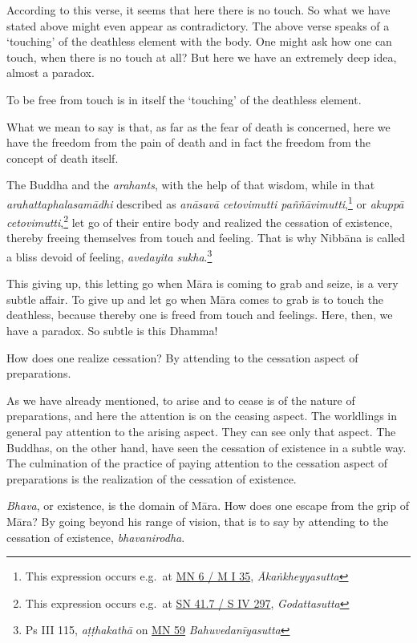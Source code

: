 According to this verse, it seems that here there is no touch. So what we have stated above might even appear as contradictory. The above verse speaks of a `touching' of the deathless element with the body. One might ask how one can touch, when there is no touch at all? But here we have an extremely deep idea, almost a paradox.

To be free from touch is in itself the `touching' of the deathless element.

What we mean to say is that, as far as the fear of death is concerned, here we have the freedom from the pain of death and in fact the freedom from the concept of death itself.

The Buddha and the \emph{arahants}, with the help of that wisdom, while in that \emph{arahattaphalasamādhi} described as \emph{anāsavā cetovimutti paññāvimutti},\footnote{This expression occurs e.g.~at \href{https://suttacentral.net/mn6/pli/ms}{MN 6 / M I 35}, \emph{Ākaṅkheyyasutta}} or \emph{akuppā cetovimutti},\footnote{This expression occurs e.g.~at \href{https://suttacentral.net/sn41.7/pli/ms}{SN 41.7 / S IV 297}, \emph{Godattasutta}} let go of their entire body and realized the cessation of existence, thereby freeing themselves from touch and feeling. That is why Nibbāna is called a bliss devoid of feeling, \emph{avedayita sukha}.\footnote{Ps III 115, \emph{aṭṭhakathā} on \href{https://suttacentral.net/mn59/pli/ms}{MN 59} \emph{Bahuvedanīyasutta}}

This giving up, this letting go when Māra is coming to grab and seize, is a very subtle affair. To give up and let go when Māra comes to grab is to touch the deathless, because thereby one is freed from touch and feelings. Here, then, we have a paradox. So subtle is this Dhamma!

How does one realize cessation? By attending to the cessation aspect of preparations.

As we have already mentioned, to arise and to cease is of the nature of preparations, and here the attention is on the ceasing aspect. The worldlings in general pay attention to the arising aspect. They can see only that aspect. The Buddhas, on the other hand, have seen the cessation of existence in a subtle way. The culmination of the practice of paying attention to the cessation aspect of preparations is the realization of the cessation of existence.

\emph{Bhava}, or existence, is the domain of Māra. How does one escape from the grip of Māra? By going beyond his range of vision, that is to say by attending to the cessation of existence, \emph{bhavanirodha}.

